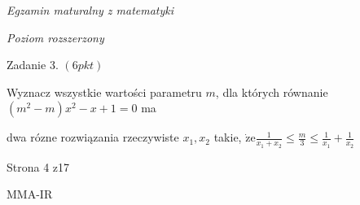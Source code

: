 \documentclass[a4paper,12pt]{article}
\begin{document}
{\it Egzamin maturalny z matematyki}

{\it Poziom rozszerzony}

Zadanie 3. $(6pkt)$

Wyznacz wszystkie wartości parametru $m$, dla których równanie $(m^{2}-m)x^{2}-x+1=0$ ma

dwa rózne rozwiązania rzeczywiste $x_{1}, x_{2}$ takie, $\displaystyle \dot{\mathrm{z}}\mathrm{e}\frac{1}{x_{1}+x_{2}}\leq\frac{m}{3}\leq\frac{1}{x_{1}}+\frac{1}{x_{2}}$

Strona 4 z17

MMA-IR
\end{document}
